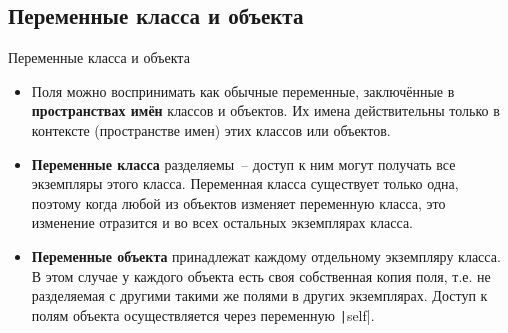 \documentclass[aspectratio=169, mathserif]{beamer}	%
\begin{document}
\subsection{Переменные класса и объекта}
\begin{frame}[fragile]{Переменные класса и объекта}
\scriptsize
\begin{itemize}
	\item Поля можно воспринимать как обычные переменные, заключённые в \textbf{пространствах имён} классов и объектов. Их имена действительны только в контексте (пространстве имен) этих классов или объектов.

	\item \textcolor{extraorange}{\textbf{Переменные класса}} разделяемы~-- доступ к ним могут получать все экземпляры этого класса. Переменная класса существует только одна, поэтому когда любой из объектов изменяет переменную класса, это изменение отразится и во всех остальных экземплярах класса.

	\item \textcolor{extraorange}{\textbf{Переменные объекта}} принадлежат каждому отдельному экземпляру класса. В этом случае у каждого объекта есть своя собственная копия поля, т.е. не разделяемая с другими такими же полями в других экземплярах. Доступ к полям объекта осуществляется через переменную \texttt|self|.
\end{itemize}
\vfill
\end{frame}
\end{document}
